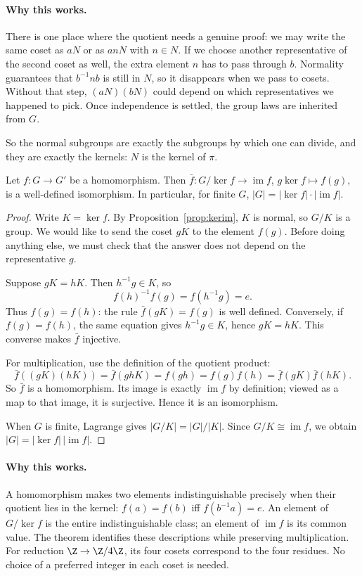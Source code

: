 \paragraph{Why this works.}
There is one place where the quotient needs a genuine proof: we may write the same coset as $aN$ or as $anN$ with $n\in N$. If we choose another representative of the second coset as well, the extra element $n$ has to pass through $b$. Normality guarantees that $b^{-1}nb$ is still in $N$, so it disappears when we pass to cosets. Without that step, $(aN)(bN)$ could depend on which representatives we happened to pick. Once independence is settled, the group laws are inherited from $G$.

So the normal subgroups are exactly the subgroups by which one can divide, and they are exactly the kernels: $N$ is the kernel of $\pi$.

\begin{theorem}\label{thm:iso1}
Let $f:G\to G'$ be a homomorphism. Then $\bar f:G/\ker f\to\operatorname{im}f$, $g\ker f\mapsto f(g)$, is a well-defined isomorphism. In particular, for finite $G$, $|G|=|\ker f|\cdot|\operatorname{im}f|$.
\end{theorem}
\begin{proof}
Write $K=\ker f$. By Proposition~\ref{prop:kerim}, $K$ is normal, so $G/K$ is a group. We would like to send the coset $gK$ to the element $f(g)$. Before doing anything else, we must check that the answer does not depend on the representative $g$.

Suppose $gK=hK$. Then $h^{-1}g\in K$, so
\[
f(h)^{-1}f(g)=f(h^{-1}g)=e.
\]
Thus $f(g)=f(h)$: the rule $\bar f(gK)=f(g)$ is well defined. Conversely, if $f(g)=f(h)$, the same equation gives $h^{-1}g\in K$, hence $gK=hK$. This converse makes $\bar f$ injective.

For multiplication, use the definition of the quotient product:
\[
\bar f((gK)(hK))=\bar f(ghK)=f(gh)=f(g)f(h)
=\bar f(gK)\bar f(hK).
\]
So $\bar f$ is a homomorphism. Its image is exactly $\operatorname{im}f$ by definition; viewed as a map to that image, it is surjective. Hence it is an isomorphism.

When $G$ is finite, Lagrange gives $|G/K|=|G|/|K|$. Since $G/K\cong\operatorname{im}f$, we obtain $|G|=|\ker f|\,|\operatorname{im}f|$.
\end{proof}

\paragraph{Why this works.}
A homomorphism makes two elements indistinguishable precisely when their quotient lies in the kernel: $f(a)=f(b)$ iff $f(b^{-1}a)=e$. An element of $G/\ker f$ is the entire indistinguishable class; an element of $\operatorname{im}f$ is its common value. The theorem identifies these descriptions while preserving multiplication. For reduction $\Z\to\Z/4\Z$, its four cosets correspond to the four residues. No choice of a preferred integer in each coset is needed.

